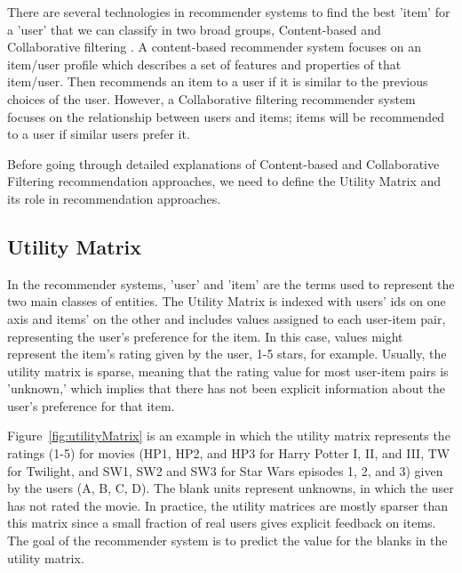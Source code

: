 There are several technologies in recommender systems to find the best 'item' for a 'user' that we can classify in two broad groups, Content-based and Collaborative ﬁltering \cite{rajaraman2011mining}. A content-based recommender system focuses on an item/user profile which describes a set of features and properties of that item/user. Then recommends an item to a user if it is similar to the previous choices of the user. However, a Collaborative filtering recommender system focuses on the relationship between users and items; items will be recommended to a user if similar users prefer it. 

Before going through detailed explanations of Content-based and Collaborative Filtering recommendation approaches, we need to define the Utility Matrix and its role in recommendation approaches. 
\subsection{Utility Matrix}
In the recommender systems, 'user' and 'item' are the terms used to represent the two main classes of entities.  The Utility Matrix is indexed with users' ids on one axis and items' on the other and includes values assigned to each user-item pair, representing the user's preference for the item. In this case, values might represent the item's rating given by the user, 1-5 stars, for example. Usually, the utility matrix is sparse, meaning that the rating value for most user-item pairs is 'unknown,' which implies that there has not been explicit information about the user's preference for that item. 

Figure~\ref{fig:utilityMatrix} is an example in which the utility matrix represents the ratings (1-5) for movies (HP1, HP2, and HP3 for Harry Potter I, II, and III, TW for Twilight, and SW1,
SW2 and SW3 for Star Wars episodes 1, 2, and 3) given by the users (A, B, C, D). The blank units represent unknowns, in which the user has not rated the movie. In practice, the utility matrices are mostly sparser than this matrix since a small fraction of real users gives explicit feedback on items. The goal of the recommender system is to predict the value for the blanks in the utility matrix.


